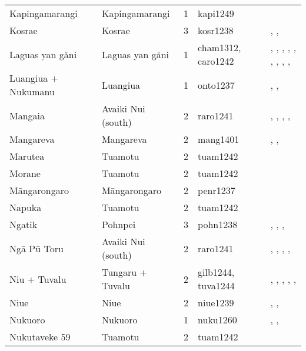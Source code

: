 \begin{longtable}{p{4.5cm}p{2cm}p{2cm}p{2cm}p{4cm}}
  Kapingamarangi & Kapingamarangi & 1 & kapi1249 & \citet{buck1950} \\ 
  Kosrae & Kosrae & 3 & kosr1238 & \citet{athens2007prehistoric}, \citet{graves1986late}, \citet{peoples1991} \\ 
  Laguas yan gåni & Laguas yan gåni & 1 & cham1312, caro1242 & \citet{cordy1983social}, \citet{cordy1983social}, \citet{cordy1983social}, \citet{thompson_1971}, \citet{thompson_1971}, \citet{thompson_1971}, \citet{josephandmurray1951}, \citet{josephandmurray1951}, \citet{spehr1954}, \citet{spehr1954} \\ 
  Luangiua + Nukumanu & Luangiua & 1 & onto1237 & \citet{sahlins1958social}, \citet{bayliss1974constraints}, \citet{donner1991} \\ 
  Mangaia & Avaiki Nui (south) & 2 & raro1241 & \citet{bellwood1971varieties}, \citet{buck1934}, \citet{crocombe_1967}, \citet{hayes1981cook}, \citet{walter1996} \\ 
  Mangareva & Mangareva & 2 & mang1401 & \citet{buck1938}, \citet{conte2004archaeological}, \citet{green2000mangarevan} \\ 
  Marutea & Tuamotu & 2 & tuam1242 & \citet{emory1975material} \\ 
  Morane & Tuamotu & 2 & tuam1242 & \citet{emory1975material} \\ 
  Māngarongaro & Māngarongaro & 2 & penr1237 & \citet{buck1932b} \\ 
  Napuka & Tuamotu & 2 & tuam1242 & \citet{emory1975material} \\ 
  Ngatik & Pohnpei & 3 & pohn1238 & \citet{hanlon2019upon}, \citet{haun1984prehistoric}, \citet{raynor1991indigenous}, \citet{riesenberg1968native} \\ 
  Ngā Pū Toru & Avaiki Nui (south) & 2 & raro1241 & \citet{bellwood1971varieties}, \citet{buck1934}, \citet{crocombe_1967}, \citet{hayes1981cook}, \citet{walter1996} \\ 
  Niu + Tuvalu & Tungaru + Tuvalu & 2 & gilb1244, tuva1244 & \citet{lambert1966}, \citet{lambert1975makin}, \citet{lambert1991}, \citet{macdonald1982cinderellas}, \citet{macdonald1982cinderellas}, \citet{goldsmith1991} \\ 
  Niue & Niue & 2 & niue1239 & \citet{loeb1978}, \citet{smith1983niue}, \citet{walter_anderson1995} \\ 
  Nukuoro & Nukuoro & 1 & nuku1260 & \citet{carroll1966nukuoro}, \citet{carroll1975pacific}, \citet{eilers_1934} \\ 
  Nukutaveke 59 & Tuamotu & 2 & tuam1242 & \citet{emory1975material} \\ 

\end{longtable}
